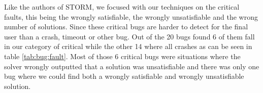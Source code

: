 Like the authors of STORM, we focused with our techniques on the critical faults, this being the wrongly satisfiable, the wrongly unsatisfiable and the wrong number of solutions. Since these critical bugs are harder to detect for the final user than a crash, timeout or other bug. Out of the 20 bugs found 6 of them fall in our category of critical while the other 14 where all crashes as can be seen in table \ref{tab:bug:fault}. Most of those 6 critical bugs were situations where the solver wrongly outputted that a solution was unsatisfiable and there was only one bug where we could find both a wrongly satisfiable and wrongly unsatisfiable solution.


